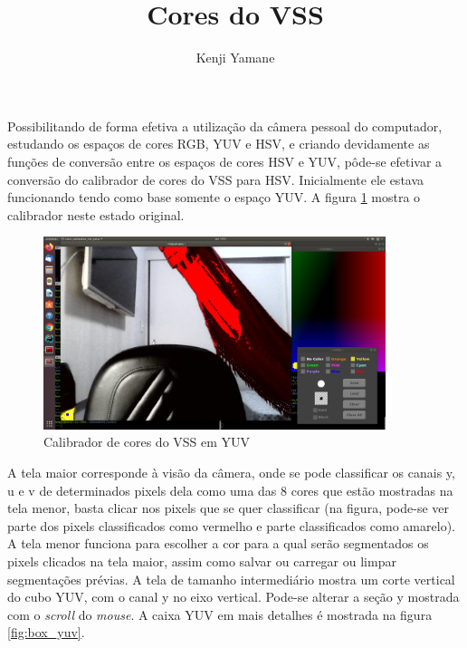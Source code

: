 \documentclass{article}[twocolumn]
\title{Cores do VSS}
\author{Kenji Yamane}
\begin{document}
	Possibilitando de forma efetiva a utiliza\c{c}\~ao da c\^amera pessoal do
	computador, estudando os espa\c{c}os de cores RGB, YUV e HSV, e criando
	devidamente as fun\c{c}\~oes de convers\~ao entre os espa\c{c}os de cores
	HSV e YUV, p\^ode-se efetivar a convers\~ao do calibrador de cores do VSS
	para HSV. Inicialmente ele estava funcionando tendo como base somente o espa\c{c}o
	YUV. A figura \ref{fig:cali_yuv} mostra o calibrador neste estado original.
	\begin{figure}[H]
		\centering
		\includegraphics[width=10cm]{color_calibrator_yuv.png}
		\caption{Calibrador de cores do VSS em YUV}
		\label{fig:cali_yuv}
	\end{figure}
	A tela maior corresponde \`a vis\~ao da c\^amera, onde se pode classificar os canais y, u e v
	de determinados pixels dela como uma das 8 cores que est\~ao mostradas na tela menor, basta
	clicar nos pixels que se quer classificar (na figura, pode-se ver parte dos pixels
	classificados como vermelho e parte classificados como amarelo). A tela menor funciona para
	escolher a cor para a qual ser\~ao segmentados os pixels clicados na tela maior, assim como
	salvar ou carregar ou limpar segmenta\c{c}\~oes pr\'evias. A tela de tamanho intermedi\'ario
	mostra um corte vertical do cubo YUV, com o canal y no eixo vertical. Pode-se alterar a
	se\c{c}\~ao y mostrada com o \textit{scroll} do \textit{mouse}. A caixa YUV em mais detalhes
	\'e mostrada na figura \ref{fig:box_yuv}.
\end{document}
